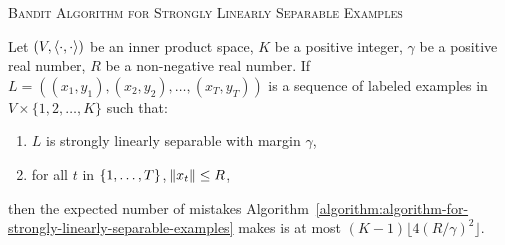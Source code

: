 \begin{algorithm}[h]
\caption{\textsc{Bandit Algorithm for Strongly Linearly Separable Examples}
\label{algorithm:algorithm-for-strongly-linearly-separable-examples}}
\begin{algorithmic}[1]
{
\ELSE
{}
\label{line:pos-update}
\ENDIF
\ELSE
{}
\label{line:neg-update}
\ELSE
{}
\ENDIF
\ENDIF
\ENDFOR
}
\end{algorithmic}
\end{algorithm}

\begin{theorem}
\label{theorem:strongly-separable-examples-mistake-upper-bound}
Let $(V, \left\langle \cdot, \cdot \right\rangle)$ be an inner product space, $K$ be a positive
integer, $\gamma$ be a positive real number, $R$ be a non-negative real number. If
$L = ((x_1, y_1), (x_2, y_2), \dots, (x_T, y_T))$ is a sequence of labeled examples in
$V \times \{1,2,\dots,K\}$ such that:
\begin{enumerate}
  \item $L$ is strongly linearly separable with margin $\gamma$,
  \item for all $t$ in $\cbr{1,\ldots,T}$, $\norm{x_t} \le R$,
\end{enumerate}
then the expected number of mistakes
Algorithm~\ref{algorithm:algorithm-for-strongly-linearly-separable-examples}
makes is at most $(K-1) \lfloor 4(R/\gamma)^2 \rfloor$.
\end{theorem}

